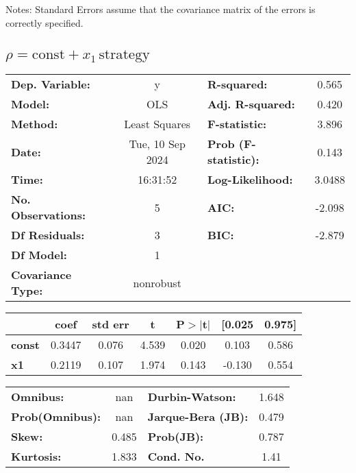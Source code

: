 \documentclass{article}
\begin{document}
Notes: \newline
[1] Standard Errors assume that the covariance matrix of the errors is correctly specified.

\subsection{$\rho = \text{const} + x_1\,\text{strategy}$}

\begin{center}
    \begin{tabular}{lclc}
        \toprule
        \textbf{Dep. Variable:}    & y                & \textbf{  R-squared:         } & 0.565  \\
        \textbf{Model:}            & OLS              & \textbf{  Adj. R-squared:    } & 0.420  \\
        \textbf{Method:}           & Least Squares    & \textbf{  F-statistic:       } & 3.896  \\
        \textbf{Date:}             & Tue, 10 Sep 2024 & \textbf{  Prob (F-statistic):} & 0.143  \\
        \textbf{Time:}             & 16:31:52         & \textbf{  Log-Likelihood:    } & 3.0488 \\
        \textbf{No. Observations:} & 5                & \textbf{  AIC:               } & -2.098 \\
        \textbf{Df Residuals:}     & 3                & \textbf{  BIC:               } & -2.879 \\
        \textbf{Df Model:}         & 1                & \textbf{                     } &        \\
        \textbf{Covariance Type:}  & nonrobust        & \textbf{                     } &        \\
        \bottomrule
    \end{tabular}
    \begin{tabular}{lcccccc}
                       & \textbf{coef} & \textbf{std err} & \textbf{t} & \textbf{P$> |$t$|$} & \textbf{[0.025} & \textbf{0.975]} \\
        \midrule
        \textbf{const} & 0.3447        & 0.076            & 4.539      & 0.020               & 0.103           & 0.586           \\
        \textbf{x1}    & 0.2119        & 0.107            & 1.974      & 0.143               & -0.130          & 0.554           \\
        \bottomrule
    \end{tabular}
    \begin{tabular}{lclc}
        \textbf{Omnibus:}       & nan   & \textbf{  Durbin-Watson:     } & 1.648 \\
        \textbf{Prob(Omnibus):} & nan   & \textbf{  Jarque-Bera (JB):  } & 0.479 \\
        \textbf{Skew:}          & 0.485 & \textbf{  Prob(JB):          } & 0.787 \\
        \textbf{Kurtosis:}      & 1.833 & \textbf{  Cond. No.          } & 1.41  \\
        \bottomrule
    \end{tabular}
\end{center}
\end{document}
